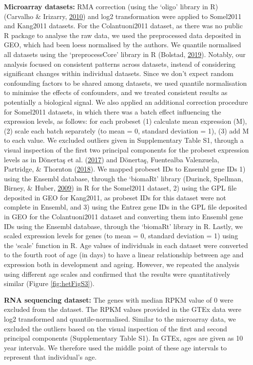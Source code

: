 \documentclass[12pt,twoside]{unicam}
\begin{document}
\textbf{Microarray datasets:} RMA correction (using the `oligo' library in R) (Carvalho \& Irizarry, \protect\hyperlink{ref-Carvalho2010}{2010}) and log2 transformation were applied to Somel2011 and Kang2011 datasets. For the Colantuoni2011 dataset, as there was no public R package to analyse the raw data, we used the preprocessed data deposited in GEO, which had been loess normalised by the authors. We quantile normalised all datasets using the `preprocessCore' library in R (Bolstad, \protect\hyperlink{ref-Bolstad2019}{2019}). Notably, our analysis focused on consistent patterns across datasets, instead of considering significant changes within individual datasets. Since we don't expect random confounding factors to be shared among datasets, we used quantile normalisation to minimise the effects of confounders, and we treated consistent results as potentially a biological signal. We also applied an additional correction procedure for Somel2011 datasets, in which there was a batch effect influencing the expression levels, as follows: for each probeset (1) calculate mean expression (M), (2) scale each batch separately (to mean = 0, standard deviation = 1), (3) add M to each value. We excluded outliers given in Supplementary Table S1, through a visual inspection of the first two principal components for the probeset expression levels as in Dönertaş et al. (\protect\hyperlink{ref-Donertas2017}{2017}) and Dönertaş, Fuentealba Valenzuela, Partridge, \& Thornton (\protect\hyperlink{ref-Donertas2018}{2018}). We mapped probeset IDs to Ensembl gene IDs 1) using the Ensembl database, through the `biomaRt' library (Durinck, Spellman, Birney, \& Huber, \protect\hyperlink{ref-Durinck2009}{2009}) in R for the Somel2011 dataset, 2) using the GPL file deposited in GEO for Kang2011, as probeset IDs for this dataset were not complete in Ensembl, and 3) using the Entrez gene IDs in the GPL file deposited in GEO for the Colantuoni2011 dataset and converting them into Ensembl gene IDs using the Ensembl database, through the `biomaRt' library in R. Lastly, we scaled expression levels for genes (to mean = 0, standard deviation = 1) using the `scale' function in R. Age values of individuals in each dataset were converted to the fourth root of age (in days) to have a linear relationship between age and expression both in development and ageing. However, we repeated the analysis using different age scales and confirmed that the results were quantitatively similar (Figure \ref{fig:hetFigS3}).

\textbf{RNA sequencing dataset:} The genes with median RPKM value of 0 were excluded from the dataset. The RPKM values provided in the GTEx data were log2 transformed and quantile-normalised. Similar to the microarray data, we excluded the outliers based on the visual inspection of the first and second principal components (Supplementary Table S1). In GTEx, ages are given as 10 year intervals. We therefore used the middle point of these age intervals to represent that individual's age.
\end{document}
